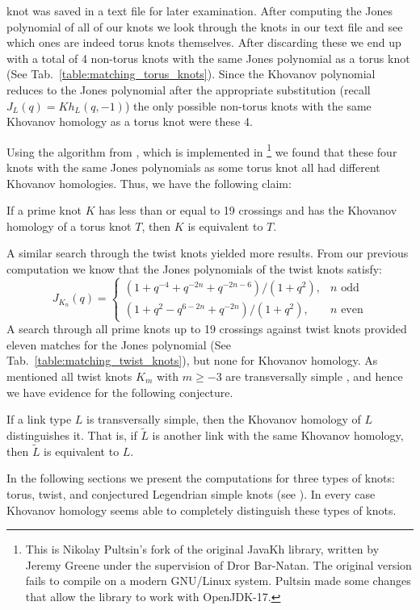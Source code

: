 knot was saved in a text file for later examination. After computing the Jones
polynomial of all of our knots we look through the knots in our text file and
see which ones are indeed torus knots themselves. After discarding these
we end up with a total of 4 non-torus knots with the same Jones polynomial as a
torus knot (See Tab.~\ref{table:matching_torus_knots}).
Since the Khovanov polynomial reduces to the Jones polynomial after the
appropriate substitution
(recall $J_{L}(q)=Kh_{L}(q,-1)$) the only possible non-torus knots with
the same Khovanov homology as a torus knot were these 4.
\par\hfill\par
Using the algorithm from \cite{BarNatan2006FASTKH}, which is implemented in
\cite{JavaKhv2}\footnote{
    This is Nikolay Pultsin's fork of the original JavaKh library, written by
    Jeremy Greene under the supervision of Dror Bar-Natan. The original version
    fails to compile on a modern GNU/Linux system. Pultsin made some changes
    that allow the library to work with OpenJDK-17.
}
we found that these four knots with the same Jones polynomials as some
torus knot all had different Khovanov homologies. Thus, we have the
following claim:
\begin{theorem}
    If a prime knot $K$ has less than or equal to 19 crossings and has
    the Khovanov homology of a torus knot $T$,
    then $K$ is equivalent to $T$.
\end{theorem}
A similar search through the twist knots yielded more results.
From our previous computation we know that the Jones polynomials of the twist
knots satisfy:
\begin{equation}
    J_{K_{n}}(q)=
    \begin{cases}
        (1+q^{-4}+q^{-2n}+q^{-2n-6})/(1+q^{2}),&n\textrm{ odd}\\
        (1+q^{2}-q^{6-2n}+q^{-2n})/(1+q^{2}),&n\textrm{ even}
    \end{cases}
\end{equation}
A search through all prime knots up to 19 crossings against twist knots
provided eleven matches for the Jones polynomial
(See Tab.~\ref{table:matching_twist_knots}), but
none for Khovanov homology. As mentioned all twist knots $K_{m}$ with
$m\geq{-3}$ are transversally simple
\cite{EtnyreEtAlLegendrianAndTransverseTwistKnots}, and hence we have evidence
for the following conjecture.
\begin{conjecture}
    If a link type $L$ is transversally simple, then the Khovanov
    homology of $L$ distinguishes it. That is, if $\tilde{L}$
    is another link with the same Khovanov homology, then $\tilde{L}$ is
    equivalent to $L$.
\end{conjecture}
In the following sections we present the computations for three types of knots:
torus, twist, and conjectured Legendrian simple knots
(see \cite{LegendrianKnotAtlas}). In every case Khovanov
homology seems able to completely distinguish these types of knots.
